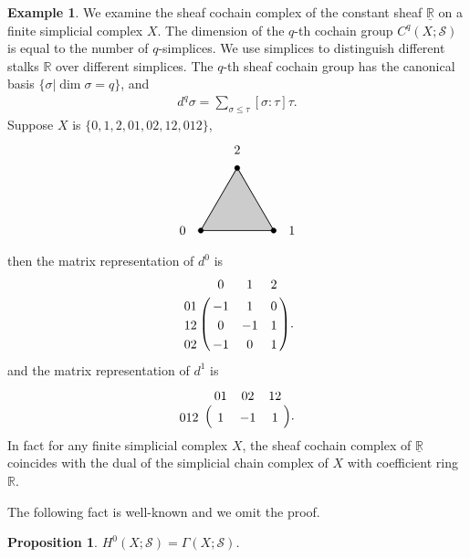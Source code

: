 \documentclass[11pt]{article}
\newtheorem{proposition}{Proposition}[section]
\theoremstyle{definition}
\theoremstyle{definition}
\newtheorem{example}{Example}[section]
\newcommand{\real}{\mathbb R}
\begin{document}
\begin{example}
    We examine the sheaf cochain complex of the constant sheaf $\underline{\mathbb{R}}$ on a finite simplicial complex $X$.
    The dimension of the $q$-th cochain group $C^q(X; \mathscr{S})$ is equal to the number of $q$-simplices. 
    We use simplices to distinguish different stalks $\real$ over different simplices. 
    The $q$-th sheaf cochain group has the canonical basis $\{ \sigma \vert \dim \sigma = q \}$,
    and
    \begin{align*}
        d^q \sigma = \sum_{\sigma \leqslant \tau} [\sigma: \tau]\tau.
    \end{align*}
    Suppose $X$ is $\{0,1,2,01,02,12,012\}$,
    \begin{align*}
        \begin{tikzpicture}
            \centering
            \draw[thick] (0,0) -- (2,0) -- (1, 1.732) -- (0,0);
            \draw[fill=black!20!white] (0,0) -- (2,0) -- (1, 1.732) -- (0,0);
            \node at (-0.5,0) {$0$};
            \node at (2.5,0) {$1$};
            \node at (1,2.232) {$2$};
            \draw[fill=black] (0,0) circle (2pt);
            \draw[fill=black] (1,1.732) circle (2pt);
            \draw[fill=black] (2,0) circle (2pt);
        \end{tikzpicture}
    \end{align*} 
    then the matrix representation of $d^0$ is 
    \begin{align*}
        \bordermatrix{
            ~  &   0  & 1   & 2  \cr
            01 & -1 & 1 & 0 \cr
            12 & 0  & -1 & 1 \cr
            02 & -1 & 0 & 1 \cr
        }.
    \end{align*}
    and the matrix representation of $d^1$ is 
    \begin{align*}
        \bordermatrix{
            ~  &   01  & 02   & 12  \cr
            012 & 1 & -1 & 1 \cr
        }.
    \end{align*}
    In fact for any finite simplicial complex $X$, 
    the sheaf cochain complex of $\underline{\mathbb{R}}$ coincides with the dual of the simplicial chain complex of $X$ with coefficient ring $\mathbb R$.
\end{example}

The following fact is well-known and we omit the proof.
\begin{proposition}\cite[Lemma 9.5]{elementaryappliedtopology}
    $H^{0}(X; \mathscr{S}) = \Gamma(X; \mathscr{S})$.
\end{proposition}
\end{document}
